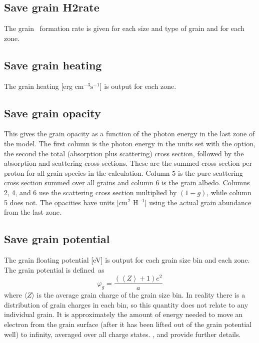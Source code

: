 \subsection{Save grain H2rate}

The grain \htwo\ formation rate is given for each size and type of grain
and for each zone.

\subsection{Save grain heating}

The grain heating [erg cm$^{-3} \mathrm{s}^{-1}$] is output for each zone.

\subsection{Save grain opacity}

This gives the grain opacity as a function of the photon energy in the last
zone of the model.  The first column is the photon energy in the units set
with the  option, the second the total (absorption plus
scattering) cross section, followed by the absorption and scattering cross
sections.  These are the summed cross section per proton for all grain
species in the calculation. Column 5 is the pure scattering cross section
summed over all grains and column 6 is the grain albedo.   Columns 2, 4,
and 6 use the scattering cross section multiplied by $(1-g)$, while column
5 does not. The opacities have units [cm$^{2}$ H$^{-1}$] using the actual
grain abundance from the last zone.

\subsection{Save grain potential}

 The grain floating potential [eV] is output for each grain size bin and
each zone. The grain potential is defined~as
\begin{equation}
\varphi _g  = \frac{{\left( {\left\langle Z \right\rangle  + 1} \right)e^2
}}{a}
\end{equation}
where $\langle Z\rangle$ is the average grain charge of the grain size bin.  In reality
there is a distribution of grain charges in each bin, so this quantity does
not relate to any individual grain. It is approximately the amount of energy
needed to move an electron from the grain surface (after it has been lifted
out of the grain potential well) to infinity, averaged over all charge
states.
\citet{Weingartner2001a}, \citet{VanHoof2004} and \citet{Weingartner2006} provide further details.

